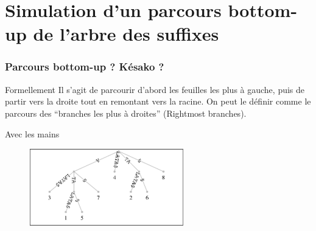 \documentclass[10pt]{beamer}
\begin{document}


\section{Simulation d'un parcours bottom-up de l'arbre des suffixes}
\label{sec:appbottomup}


\begin{frame}
  \frametitle{Parcours bottom-up ? Késako ?}

  \begin{block}{Formellement}
    Il s'agit de parcourir d'abord les feuilles les plus à gauche,
    puis de partir vers la droite tout en remontant vers la racine. On
    peut le définir comme le parcours des ``branches les plus à
    droites'' (Rightmost branches).
  \end{block}

  \begin{block}{Avec les mains}
      \begin{figure}
    \includegraphics[width=0.6\textwidth]{sufftree_atalata}
  \end{figure}
  \end{block}

\end{frame}
\end{document}
